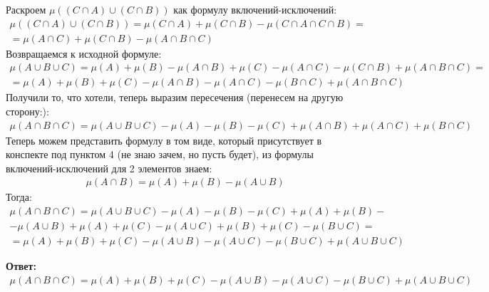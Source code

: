 \documentclass[a4paper,12pt]{article}
\begin{document}
Раскроем $\mu((C \cap A) \cup (C \cap B))$ как формулу включений-исключений:
\begin{equation*}
\begin{gathered}
\mu((C \cap A) \cup (C \cap B)) = \mu(C \cap A) + \mu(C \cap B) - \mu(C \cap A \cap C \cap B) =
\\
=
 \mu(A \cap C) + \mu(C \cap B) -  \mu(A \cap B \cap C)
\end{gathered}
\end{equation*}
Возвращаемся к исходной формуле:
\begin{equation*}
\begin{gathered}
\mu(A  \cup  B \cup C) = \mu(A) + \mu(B) - \mu(A \cap B) + \mu(C) - \mu(A \cap C) - \mu(C \cap B) + \mu(A \cap B \cap C) =
\\
=
\mu(A) + \mu(B) + \mu(C) - \mu(A \cap B) - \mu(A \cap C) - \mu(B \cap C) + \mu(A \cap B \cap C)
\end{gathered}
\end{equation*}
Получили то, что хотели, теперь выразим пересечения (перенесем на другую сторону:):
\begin{equation*}
\begin{gathered}
\mu(A \cap B \cap C) = \mu(A \cup B \cup C) - \mu(A) - \mu(B) - \mu(C)  + \mu(A \cap B) + \mu(A \cap C) + \mu(B \cap C)
\end{gathered}
\end{equation*}
Теперь можем представить формулу в том виде, который присутствует в конспекте под пунктом 4 (не знаю зачем, но пусть будет), из формулы включений-исключений для 2 элементов знаем:
\begin{equation*}
\begin{gathered}
\mu(A \cap B) = \mu(A) + \mu(B) - \mu(A \cup B)
\end{gathered}
\end{equation*}
Тогда:
\begin{equation*}
\begin{gathered}
\mu(A \cap B \cap C) = \mu(A \cup B \cup C) - \mu(A) - \mu(B) - \mu(C)  + \mu(A) + \mu(B) -
\\
-
 \mu(A \cup B) + \mu(A) + \mu(C) - \mu(A \cup C) + \mu(B) + \mu(C) - \mu(B \cup C) = 
\\
=
\mu(A) + \mu(B) + \mu(C) - \mu(A \cup B) - \mu(A \cup C) - \mu(B \cup C) + \mu(A \cup B \cup C)
\end{gathered}
\end{equation*}
\begin{center}
\textbf{Ответ: } \begin{equation*}
\begin{gathered}
\mu(A \cap B \cap C) = \mu(A) + \mu(B) + \mu(C) - \mu(A \cup B) - \mu(A \cup C) - \mu(B \cup C) + \mu(A \cup B \cup C)
\end{gathered}
\end{equation*}
\end{center}
\clearpage
\end{document}
